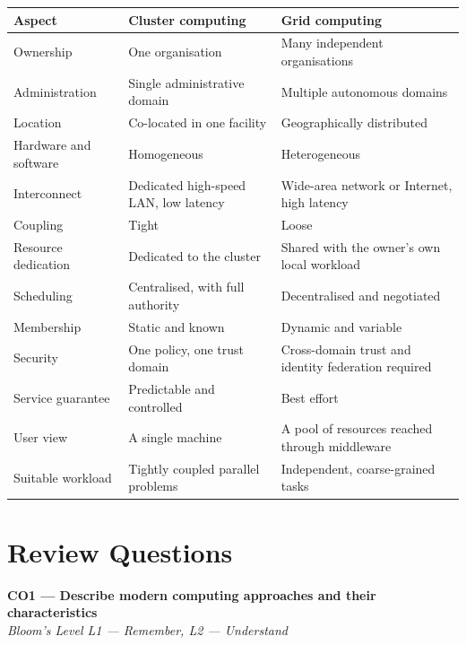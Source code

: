 \begin{center}
\begin{tabularx}{\textwidth}{@{}p{3.2cm}LL@{}}
\toprule
\textbf{Aspect} & \textbf{Cluster computing} & \textbf{Grid computing} \\
\midrule
Ownership & One organisation & Many independent organisations \\
Administration & Single administrative domain & Multiple autonomous domains \\
Location & Co-located in one facility & Geographically distributed \\
Hardware and software & Homogeneous & Heterogeneous \\
Interconnect & Dedicated high-speed LAN, low latency & Wide-area network or
  Internet, high latency \\
Coupling & Tight & Loose \\
Resource dedication & Dedicated to the cluster & Shared with the owner's own
  local workload \\
Scheduling & Centralised, with full authority & Decentralised and
  negotiated \\
Membership & Static and known & Dynamic and variable \\
Security & One policy, one trust domain & Cross-domain trust and identity
  federation required \\
Service guarantee & Predictable and controlled & Best effort \\
User view & A single machine & A pool of resources reached through
  middleware \\
Suitable workload & Tightly coupled parallel problems & Independent,
  coarse-grained tasks \\
\bottomrule
\end{tabularx}
\end{center}

\section{Review Questions}

\textbf{CO1 --- Describe modern computing approaches and their
characteristics}\\
\textit{Bloom's Level L1 --- Remember, L2 --- Understand}

